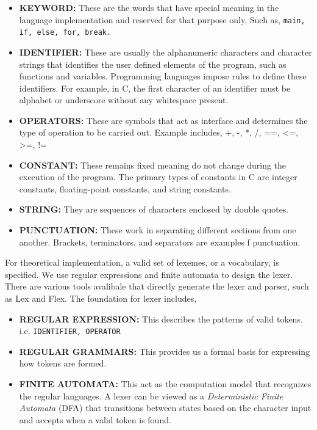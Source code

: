 \documentclass[acmlarge, nonacm]{acmart}
\begin{document}
\begin{itemize}
\item{\textbf{KEYWORD:}} These are the words that have special meaning in the language implementation and reserved for that purpose only. Such as, \verb|main, if, else, for, break.|
\item{\textbf{IDENTIFIER:}} These are usually the alphanumeric characters and character strings that identifies the user defined elements of the program, such as functions and variables. Programming languages impose rules to define these identifiers. For example, in C, the first character of an identifier must be alphabet or underscore without any whitespace present.
\item{\textbf{OPERATORS:}} These are symbols that act as interface and determines the type of operation to be carried out. Example includes, +, -, *, /, ==, <=, >=, !=
\item{\textbf{CONSTANT:}} These remains fixed meaning do not change during the execution of the program. The primary types of constants in C are integer constants, floating-point constants, and string constants.
\item{\textbf{STRING:}} They are sequences of characters enclosed by double quotes.
\item{\textbf{PUNCTUATION:}} These work in separating different sections from one another. Brackets, terminators, and separators are examples f punctuation.
\end{itemize}

For theoretical implementation, a valid set of lexemes, or a vocabulary, is specified. We use regular expressions and finite automata to design the lexer. There are various tools avalibale that directly generate the lexer and parser, such as Lex and Flex. The foundation for lexer includes,
\begin{itemize}
\item{\textbf{REGULAR EXPRESSION:}} This describes the patterns of valid tokens. i.e. \verb|IDENTIFIER, OPERATOR|
\item{\textbf{REGULAR GRAMMARS:}} This provides us a formal basis for expressing how tokens are formed.
\item{\textbf{FINITE AUTOMATA:}} This act as the computation model that recognizes the regular languages. A lexer can be viewed as a \textit{Deterministic Finite Automata} (DFA) that transitions between states based on the character input and accepts when a valid token is found.
\end{itemize}
\end{document}
